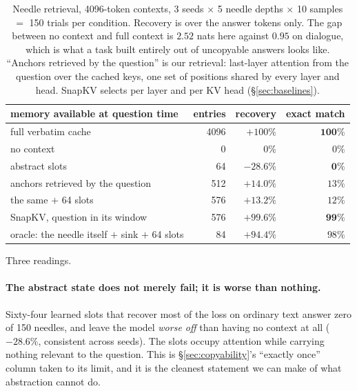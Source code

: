 \documentclass[11pt]{article}
\begin{document}
\begin{table}[ht]
\centering
\small
\begin{tabular}{lrrr}
\toprule
memory available at question time & entries & recovery & exact match \\
\midrule
full verbatim cache                        & 4096 & $+100\%$  & $\mathbf{100\%}$ \\
no context                                 & 0    & $0\%$     & $0\%$ \\
\midrule
abstract slots                             & 64   & $\mathbf{-28.6\%}$ & $\mathbf{0\%}$ \\
anchors retrieved by the question          & 512  & $+14.0\%$ & $13\%$ \\
\quad the same $+$ 64 slots                & 576  & $+13.2\%$ & $12\%$ \\
SnapKV, question in its window             & 576  & $+99.6\%$ & $\mathbf{99\%}$ \\
oracle: the needle itself $+$ sink $+$ 64 slots & 84 & $+94.4\%$ & $98\%$ \\
\bottomrule
\end{tabular}
\caption{Needle retrieval, 4096-token contexts, 3 seeds $\times$ 5 needle
depths $\times$ 10 samples $=$ 150 trials per condition. Recovery is over the
answer tokens only. The gap between no context and full context is $2.52$ nats
here against $0.95$ on dialogue, which is what a task built entirely out of
uncopyable answers looks like. ``Anchors retrieved by the question'' is our
retrieval: last-layer attention from the question over the cached keys, one set
of positions shared by every layer and head. SnapKV selects per layer and per KV
head (\S\ref{sec:baselines}).}
\label{tab:needle}
\end{table}

Three readings.

\paragraph{The abstract state does not merely fail; it is worse than nothing.}
Sixty-four learned slots that recover most of the loss on ordinary text answer
zero of 150 needles, and leave the model \emph{worse off} than having no context
at all ($-28.6\%$, consistent across seeds). The slots occupy attention while
carrying nothing relevant to the question. This is \S\ref{sec:copyability}'s
``exactly once'' column taken to its limit, and it is the cleanest statement we
can make of what abstraction cannot do.
\end{document}
